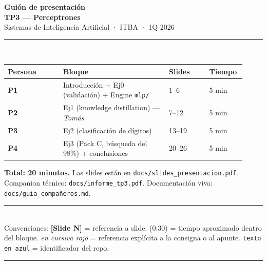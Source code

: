 \documentclass[11pt,a4paper]{article}
\newcommand{\code}[1]{\texttt{\textcolor{accent}{#1}}}
\newcommand{\file}[1]{\texttt{\small #1}}
\newcommand{\slidenum}[1]{\textcolor{accent}{\textbf{[Slide #1]}}}
\newcommand{\timing}[1]{\textcolor{muted}{\small (#1)}}
\newcommand{\enunciado}[1]{\textcolor{warn}{\textit{#1}}}
\begin{document}
\begin{titlepage}
\thispagestyle{empty}
\vspace*{2cm}
\begin{flushleft}
{\fontsize{36}{42}\selectfont\bfseries\color{ink}Guión de presentación}\\[0.4em]
{\fontsize{22}{26}\selectfont\bfseries\color{accent}TP3 — Perceptrones}\\[1em]
{\large\color{muted}Sistemas de Inteligencia Artificial · ITBA · 1Q 2026}\\[2.5em]

\rule{\linewidth}{0.4pt}\\[0.6em]

\begin{tabular}{@{}p{0.22\linewidth}p{0.42\linewidth}p{0.16\linewidth}p{0.12\linewidth}@{}}
\toprule
\textbf{Persona} & \textbf{Bloque} & \textbf{Slides} & \textbf{Tiempo} \\
\midrule
\textbf{P1} & Introducción + Ej0 (validación) + Engine \code{mlp/} & 1--6   & 5 min \\
\textbf{P2} & Ej1 (knowledge distillation) — \emph{Tomás} & 7--12  & 5 min \\
\textbf{P3} & Ej2 (clasificación de dígitos)               & 13--19 & 5 min \\
\textbf{P4} & Ej3 (Pack C, búsqueda del 98\%) + conclusiones & 20--26 & 5 min \\
\bottomrule
\end{tabular}

\vspace{2em}
\textbf{Total: 20 minutos.} Las slides están en \file{docs/slides\_presentacion.pdf}.
Companion técnico: \file{docs/informe\_tp3.pdf}. Documentación viva: \file{docs/guia\_compañeros.md}.
\end{flushleft}

\vfill
\begin{flushleft}
\rule{\linewidth}{0.4pt}\\[0.4em]
\textcolor{muted}{\small Convenciones: \slidenum{N} = referencia a slide. \timing{0:30} = tiempo aproximado dentro del bloque. \enunciado{en cursiva rojo} = referencia explícita a la consigna o al apunte. \code{texto en azul} = identificador del repo.}
\end{flushleft}
\end{titlepage}

\tableofcontents
\bigskip\hrule\bigskip

\end{document}
